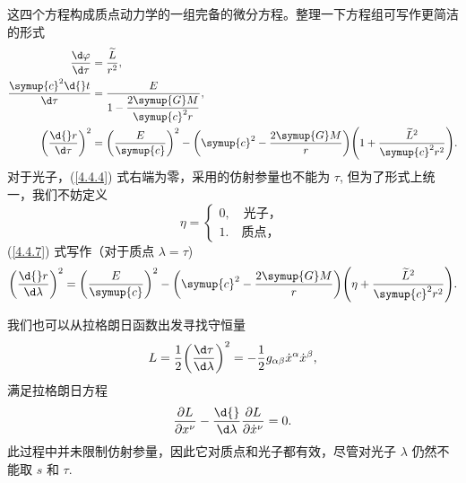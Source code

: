 \documentclass[UTF8, 12pt, a4paper, oneside, onecolumn, fontset=none]{ctexart}
\begin{document}
这四个方程构成质点动力学的一组完备的微分方程。整理一下方程组可写作更简洁的形式
\begin{align}
\frac{\d\varphi}{\d\tau}&=\frac{\widetilde{L}}{r^{2}},\\
\frac{\symup{c}^{2}\d{}t}{\d\tau}&=\frac{E}{1-\dfrac{2\symup{G}M}{\symup{c}^{2}r}},\\
\mleft(\frac{\d{}r}{\d\tau}\mright)^{2}&=\mleft(\frac{E}{\symup{c}}\mright)^{2}-\mleft(\symup{c}^{2}-\frac{2\symup{G}M}{r}\mright)\mleft(1+\frac{\widetilde{L}^{2}}{\symup{c}^{2}r^{2}}\mright).\label{4.4.7}
\end{align}
对于光子，(\ref{4.4.4}) 式右端为零，采用的仿射参量也不能为 $\tau$, 但为了形式上统一，我们不妨定义
\begin{equation}
\eta=
\begin{cases}
0,\quad\text{光子，}\\
1.\quad\text{质点，}
\end{cases}
\end{equation}
(\ref{4.4.7}) 式写作（对于质点 $\lambda=\tau$)
\begin{equation}
\mleft(\frac{\d{}r}{\d\lambda}\mright)^{2}=\mleft(\frac{E}{\symup{c}}\mright)^{2}-\mleft(\symup{c}^{2}-\frac{2\symup{G}M}{r}\mright)\mleft(\eta+\frac{\widetilde{L}^{2}}{\symup{c}^{2}r^{2}}\mright).
\end{equation}

我们也可以从拉格朗日函数出发寻找守恒量
\begin{equation}
L=\frac{1}{2}\mleft(\frac{\d\tau}{\d\lambda}\mright)^{2}=-\frac{1}{2}g_{\alpha\beta}\dot{x}^{\alpha}\dot{x}^{\beta},
\end{equation}
满足拉格朗日方程
\begin{equation}
\frac{\partial{}L}{\partial{}x^{\nu}}-\frac{\d{}}{\d\lambda}\frac{\partial{}L}{\partial\dot{x}^{\nu}}=0.
\end{equation}
此过程中并未限制仿射参量，因此它对质点和光子都有效，尽管对光子 $\lambda$ 仍然不能取 $s$ 和 $\tau$.
\end{document}
